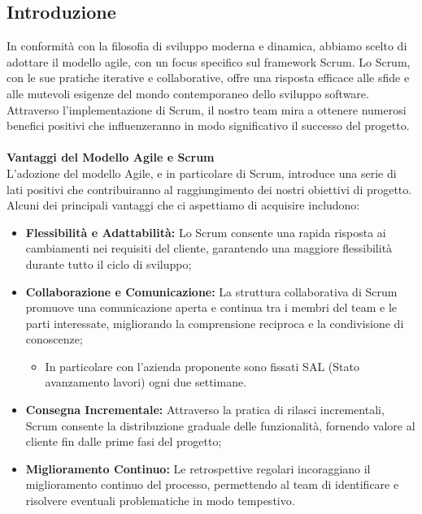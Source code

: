 \documentclass{article}
\begin{document}
\subsection{Introduzione}
In conformità con la filosofia di sviluppo moderna e dinamica, abbiamo scelto di adottare il modello agile, con un focus specifico sul framework Scrum.
Lo Scrum, con le sue pratiche iterative e collaborative, offre una risposta efficace alle sfide e alle mutevoli esigenze del mondo contemporaneo dello sviluppo software.\\
Attraverso l'implementazione di Scrum, il nostro team mira a ottenere numerosi benefici positivi che influenzeranno in modo significativo il successo del progetto.
\\
\\
\textbf{Vantaggi del Modello Agile e Scrum}
\\L'adozione del modello Agile, e in particolare di Scrum, introduce una serie di lati positivi che contribuiranno al raggiungimento dei nostri obiettivi di progetto.
Alcuni dei principali vantaggi che ci aspettiamo di acquisire includono:

\begin{itemize}
    \item \textbf{Flessibilità e Adattabilità:} Lo Scrum consente una rapida risposta ai cambiamenti nei requisiti del cliente, garantendo una maggiore flessibilità durante tutto il ciclo di sviluppo;
    \item \textbf{Collaborazione e Comunicazione:} La struttura collaborativa di Scrum promuove una comunicazione aperta e continua tra i membri del team e le parti interessate, migliorando la comprensione reciproca e la condivisione di conoscenze;
          \begin{itemize}
              \item In particolare con l'azienda proponente sono fissati SAL (Stato avanzamento lavori) ogni due settimane.
          \end{itemize}
    \item \textbf{Consegna Incrementale:} Attraverso la pratica di rilasci incrementali, Scrum consente la distribuzione graduale delle funzionalità, fornendo valore al cliente fin dalle prime fasi del progetto;
    \item \textbf{Miglioramento Continuo:} Le retrospettive regolari incoraggiano il miglioramento continuo del processo, permettendo al team di identificare e risolvere eventuali problematiche in modo tempestivo.
\end{itemize}
\end{document}
